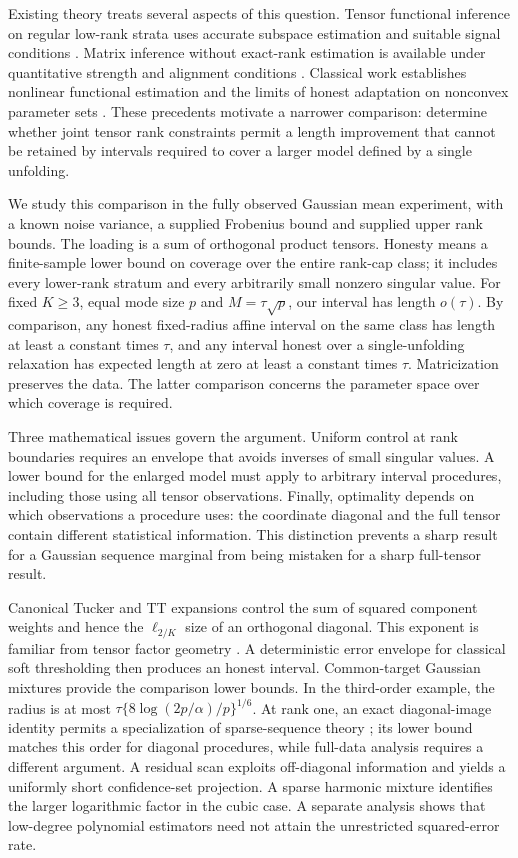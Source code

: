 \documentclass[11pt]{article}
\theoremstyle{remark}
\begin{document}
Existing theory treats several aspects of this question. Tensor functional inference on regular low-rank strata uses accurate subspace estimation and suitable signal conditions \citep{xu2025}. Matrix inference without exact-rank estimation is available under quantitative strength and alignment conditions \citep{choi2026}. Classical work establishes nonlinear functional estimation and the limits of honest adaptation on nonconvex parameter sets \citep{cailownonconvex2004,cailow2004,collier2017}. These precedents motivate a narrower comparison: determine whether joint tensor rank constraints permit a length improvement that cannot be retained by intervals required to cover a larger model defined by a single unfolding.

We study this comparison in the fully observed Gaussian mean experiment, with a known noise variance, a supplied Frobenius bound and supplied upper rank bounds. The loading is a sum of orthogonal product tensors. Honesty means a finite-sample lower bound on coverage over the entire rank-cap class; it includes every lower-rank stratum and every arbitrarily small nonzero singular value. For fixed $K\ge3$, equal mode size $p$ and $M=\tau\sqrt p$, our interval has length $o(\tau)$. By comparison, any honest fixed-radius affine interval on the same class has length at least a constant times $\tau$, and any interval honest over a single-unfolding relaxation has expected length at zero at least a constant times $\tau$. Matricization preserves the data. The latter comparison concerns the parameter space over which coverage is required.

Three mathematical issues govern the argument. Uniform control at rank boundaries requires an envelope that avoids inverses of small singular values. A lower bound for the enlarged model must apply to arbitrary interval procedures, including those using all tensor observations. Finally, optimality depends on which observations a procedure uses: the coordinate diagonal and the full tensor contain different statistical information. This distinction prevents a sharp result for a Gaussian sequence marginal from being mistaken for a sharp full-tensor result.

Canonical Tucker and TT expansions control the sum of squared component weights and hence the $\ell_{2/K}$ size of an orthogonal diagonal. This exponent is familiar from tensor factor geometry \citep{fan2023}. A deterministic error envelope for classical soft thresholding \citep{donohojohnstone1994} then produces an honest interval. Common-target Gaussian mixtures provide the comparison lower bounds. In the third-order example, the radius is at most $\tau\{8\log(2p/\alpha)/p\}^{1/6}$. At rank one, an exact diagonal-image identity permits a specialization of sparse-sequence theory \citep{collier2017}; its lower bound matches this order for diagonal procedures, while full-data analysis requires a different argument. A residual scan exploits off-diagonal information and yields a uniformly short confidence-set projection. A sparse harmonic mixture identifies the larger logarithmic factor in the cubic case. A separate analysis shows that low-degree polynomial estimators need not attain the unrestricted squared-error rate.
\end{document}
